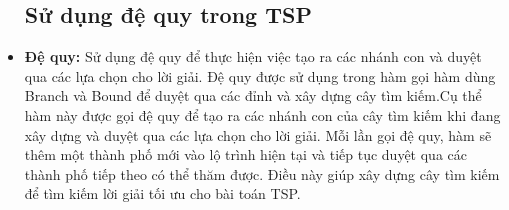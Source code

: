 \documentclass[a4paper]{article}
\begin{document}
\begin{itemize}
\subsection*{Sử dụng đệ quy trong TSP}
    \item \textbf{Đệ quy:} Sử dụng đệ quy để thực hiện việc tạo ra các nhánh con và duyệt qua các lựa chọn cho lời giải. Đệ quy được sử dụng trong hàm gọi hàm dùng Branch và Bound để duyệt qua các đỉnh và xây dựng cây tìm kiếm.Cụ thể hàm này được gọi đệ quy để tạo ra các nhánh con của cây tìm kiếm khi đang xây dựng và duyệt qua các lựa chọn cho lời giải. Mỗi lần gọi đệ quy, hàm sẽ thêm một thành phố mới vào lộ trình hiện tại và tiếp tục duyệt qua các thành phố tiếp theo có thể thăm được. Điều này giúp xây dựng cây tìm kiếm để tìm kiếm lời giải tối ưu cho bài toán TSP.
\end{itemize}
\end{document}
